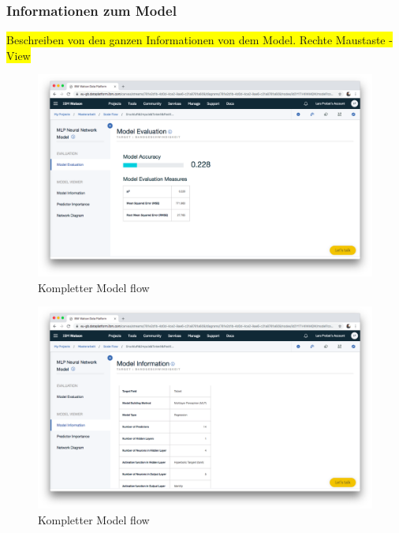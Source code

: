 \subsubsection{Informationen zum Model}
\colorbox{yellow}{Beschreiben von den ganzen Informationen von dem Model. Rechte Maustaste - View}

\begin{figure}[h]
    \centering
    \includegraphics[scale=0.26]{images/kapitel_3/model_evaluation.png}
    \caption{Kompletter Model flow}
    \label{fig:umsetzung_model_evaluation}
\end{figure}

\begin{figure}[h]
    \centering
    \includegraphics[scale=0.26]{images/kapitel_3/model_information.png}
    \caption{Kompletter Model flow}
    \label{fig:umsetzung_model_information}
\end{figure}


